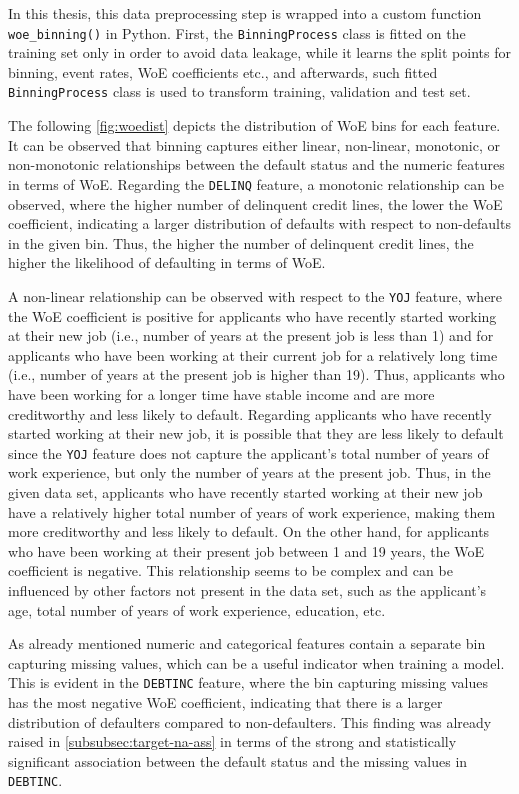 In this thesis, this data preprocessing step is wrapped into a custom function \lstinline{woe_binning()} in Python.
First, the  \lstinline{BinningProcess} class is fitted on the training set only in order to avoid data leakage, while it learns the split points for binning, event rates, WoE coefficients etc., and afterwards, such fitted  \lstinline{BinningProcess} class is used to transform training, validation and test set.


The following \autoref{fig:woedist} depicts the distribution of WoE bins for each feature. It can be observed that binning captures either linear, non-linear, monotonic, or non-monotonic relationships between the default status and the numeric features in terms of WoE.
Regarding the \texttt{DELINQ} feature, a monotonic relationship can be observed, where the higher number of delinquent credit lines, the lower the WoE coefficient, indicating a larger distribution of defaults with respect to non-defaults in the given bin.
Thus, the higher the number of delinquent credit lines, the higher the likelihood of defaulting in terms of WoE.

A non-linear relationship can be observed with respect to the \texttt{YOJ} feature, where the WoE coefficient is positive for applicants who have recently started working at their new job (i.e., number of years at the present job is less than 1) and for applicants who have been working at their current job for a relatively long time (i.e., number of years at the present job is higher than 19).
Thus, applicants who have been working for a longer time have stable income and are more creditworthy and less likely to default.
Regarding applicants who have recently started working at their new job, it is possible that they are less likely to default since the \texttt{YOJ} feature does not capture the applicant's total number of years of work experience, but only the number of years at the present job.
Thus, in the given data set, applicants who have recently started working at their new job have a relatively higher total number of years of work experience, making them more creditworthy and less likely to default. On the other hand, for applicants who have been working at their present job between 1 and 19 years, the WoE coefficient is negative.
This relationship seems to be complex and can be influenced by other factors not present in the data set, such as the applicant's age, total number of years of work experience, education, etc.

As already mentioned numeric and categorical features contain a separate bin capturing missing values, which can be a useful indicator when training a model. This is evident in the \texttt{DEBTINC} feature, where the bin capturing missing values has the most negative WoE coefficient, indicating that there is a larger distribution of defaulters compared to non-defaulters.
This finding was already raised in \autoref{subsubsec:target-na-ass} in terms of the strong and statistically significant association between the default status and the missing values in \texttt{DEBTINC}.

